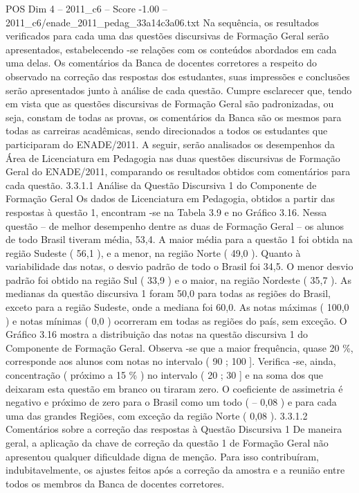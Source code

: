 \begin{textsample}{POS Dim 4 – 2011\_c6 – Score -1.00 – 2011\_c6/enade\_2011\_pedag\_33a14c3a06.txt}
Na sequência, os resultados verificados para cada uma das questões discursivas de Formação Geral serão apresentados, estabelecendo -se relações com os conteúdos abordados em cada uma delas.
Os comentários da Banca de docentes corretores a respeito do observado na correção das respostas dos estudantes, suas impressões e conclusões serão apresentados junto à análise de cada questão.
Cumpre esclarecer que, tendo em vista que as questões discursivas de Formação Geral são padronizadas, ou seja, constam de todas as provas, os comentários da Banca são os mesmos para todas as carreiras acadêmicas, sendo direcionados a todos os estudantes que participaram do ENADE/2011.
A seguir, serão analisados os desempenhos da Área de Licenciatura em Pedagogia nas duas questões discursivas de Formação Geral do ENADE/2011, comparando os resultados obtidos com comentários para cada questão. 3.3.1.1 Análise da Questão Discursiva 1 do Componente de Formação Geral Os dados de Licenciatura em Pedagogia, obtidos a partir das respostas à questão 1, encontram -se na Tabela 3.9 e no Gráfico 3.16.
Nessa questão – de melhor desempenho dentre as duas de Formação Geral – os alunos de todo Brasil tiveram média, 53,4.
A maior média para a questão 1 foi obtida na região Sudeste ( 56,1 ), e a menor, na região Norte ( 49,0 ).
Quanto à variabilidade das notas, o desvio padrão de todo o Brasil foi 34,5.
O menor desvio padrão foi obtido na região Sul ( 33,9 ) e o maior, na região Nordeste ( 35,7 ).
As medianas da questão discursiva 1 foram 50,0 para todas as regiões do Brasil, exceto para a região Sudeste, onde a mediana foi 60,0.
As notas máximas ( 100,0 ) e notas mínimas ( 0,0 ) ocorreram em todas as regiões do país, sem exceção.
O Gráfico 3.16 mostra a distribuição das notas na questão discursiva 1 do Componente de Formação Geral.
Observa -se que a maior frequência, quase 20 \%, corresponde aos alunos com notas no intervalo ( 90 ; 100 ].
Verifica -se, ainda, concentração ( próximo a 15 \% ) no intervalo ( 20 ; 30 ] e na soma dos que deixaram esta questão em branco ou tiraram zero.
O coeficiente de assimetria é negativo e próximo de zero para o Brasil como um todo ( – 0,08 ) e para cada uma das grandes Regiões, com exceção da região Norte ( 0,08 ). 3.3.1.2 Comentários sobre a correção das respostas à Questão Discursiva 1 De maneira geral, a aplicação da chave de correção da questão 1 de Formação Geral não apresentou qualquer dificuldade digna de menção.
Para isso contribuíram, indubitavelmente, os ajustes feitos após a correção da amostra e a reunião entre todos os membros da Banca de docentes corretores.

\end{textsample}
